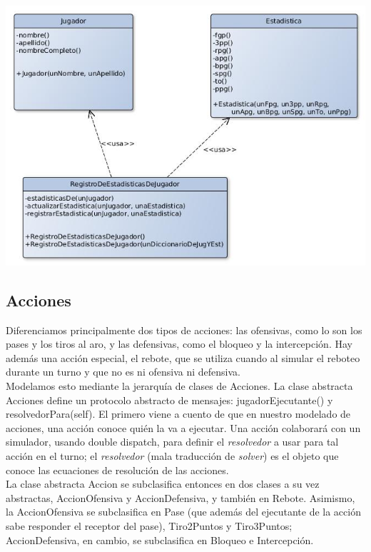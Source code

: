 \begin{center}
\includegraphics[scale=0.4]{diseno/registroDeEstadisticas.jpg}
\end{center}


\subsection{Acciones}

Diferenciamos principalmente dos tipos de acciones: las ofensivas, como lo son los pases y los tiros al aro, y las defensivas, como el bloqueo y la intercepción.
Hay además una acción especial, el rebote, que se utiliza cuando al simular el reboteo durante un turno y que no es ni ofensiva ni defensiva.\\
Modelamos esto mediante la jerarquía de clases de Acciones. La clase abstracta Acciones define un protocolo abstracto de mensajes: jugadorEjecutante() y resolvedorPara(self). El primero viene a cuento de que en nuestro modelado de acciones, una acción conoce quién la va a ejecutar. Una acción colaborará con un simulador, usando double dispatch, para definir el \textit{resolvedor} a usar para tal acción en el turno; el \textit{resolvedor} (mala traducción de \textit{solver}) es el objeto que conoce las ecuaciones de resolución de las acciones.\\
La clase abstracta Accion se subclasifica entonces en dos clases a su vez abstractas, AccionOfensiva y AccionDefensiva, y también en Rebote. Asimismo, la AccionOfensiva se subclasifica en Pase (que además del ejecutante de la acción sabe responder el receptor del pase), Tiro2Puntos y Tiro3Puntos; AccionDefensiva, en cambio, se subclasifica en Bloqueo e Intercepción.


